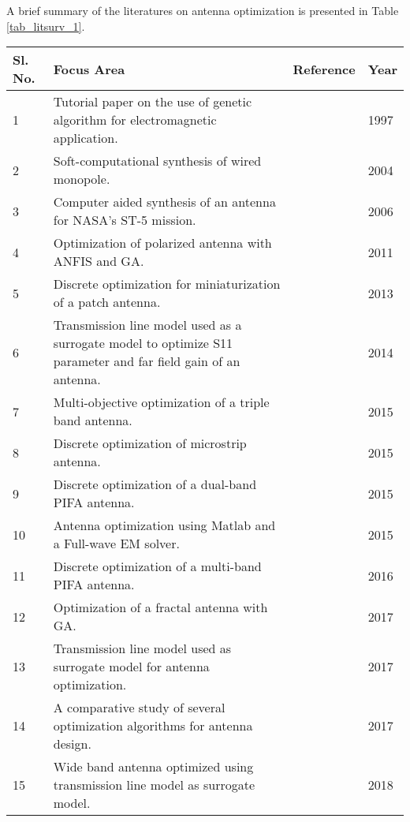 A brief summary of the literatures on antenna optimization is presented in Table \ref{tab_litsurv_1}.

\begin{table*}[]
\caption{Brief summary of literatures on Antenna Optimization}
\label{tab_litsurv_1}
\begin{tabular}{|p{}|p{}|p{}|p{}|}
\toprule
Sl. No. & Focus Area & Reference & Year \\ \midrule
1 &  Tutorial paper on the use of genetic algorithm for electromagnetic application. & \cite{ga_em} & 1997 \\ \hline
2 &  Soft-computational synthesis of wired monopole. & \cite{cadNASA2} & 2004 \\ \hline
3 &  Computer aided synthesis of an antenna for NASA's ST-5 mission. & \cite{cadNASA} & 2006 \\ \hline
4 &  Optimization of polarized antenna with ANFIS and GA. & \cite{circpol_anfis_ga} & 2011 \\ \hline
5 &  Discrete optimization for miniaturization of a patch antenna. & \cite{rectpatch_miniaturize_ga} & 2013 \\ \hline
6 &  Transmission line model used as a surrogate model to optimize S11 parameter and far field gain of an antenna. & \cite{gain_bw_opt_ga} & 2014 \\ \hline
7 &  Multi-objective optimization of a triple band antenna. & \cite{mpa_triband_opt} & 2015 \\ \hline
8 &  Discrete optimization of microstrip antenna. & \cite{mpa_multifit_ga} & 2015 \\ \hline
9 &  Discrete optimization of a dual-band PIFA antenna. & \cite{opt_pifa_ga_2} & 2015 \\ \hline
10 &  Antenna optimization using Matlab and a Full-wave EM solver. & \cite{auto_opt_matlab} & 2015 \\ \hline
11 &  Discrete optimization of a multi-band PIFA antenna. & \cite{opt_pifa_ga} & 2016 \\ \hline
12 &  Optimization of a fractal antenna with GA. & \cite{fractal_bowtie_ga} & 2017 \\ \hline
13 &  Transmission line model used as surrogate model for antenna optimization. & \cite{txm_opt} & 2017 \\ \hline
14 &  A comparative study of several optimization algorithms for antenna design. & \cite{compCAD4Ant} & 2017 \\ \hline
15 &  Wide band antenna optimized using transmission line model as surrogate model. & \cite{patch_feed_ga} & 2018 \\ \bottomrule
\end{tabular}%
\end{table*}

